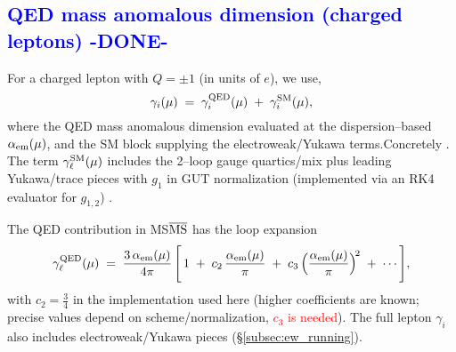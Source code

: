 \documentclass[%
 amsmath,amssymb,
 aps,
prb,
floatfix, showkeys
]{revtex4-2}
\newcommand{\need}[1]{\textcolor{red}{#1}}
\newcommand{\modif}[1]{\textcolor{blue}{#1}}
\begin{document}
{\modif{
\subsection{QED mass anomalous dimension (charged leptons) -DONE-}   %
\label{subsec:qed_ad}
}}
For a charged lepton with $Q=\pm 1$ (in units of $e$), we use, 
\begin{equation}
  \gamma_i(\mu)\;=\;\gamma^{\rm QED}_i(\mu)\;+\;\gamma^{\rm SM}_i(\mu),
\end{equation}
where the QED mass anomalous dimension evaluated at the dispersion--based $\alpha_{\rm em}(\mu)$,
and the SM block supplying the electroweak/Yukawa terms.\;Concretely \cite{Tarrach1981}.
The term $\gamma^{\rm SM}_\ell(\mu)$ includes the 2--loop gauge quartics/mix plus leading
Yukawa/trace pieces with $g_1$ in GUT normalization (implemented via an RK4 evaluator
for $g_{1,2}$) \cite{MachacekVaughn1983-85,Buttazzo2013}.
  
The QED contribution in MS$\overline{\rm MS}$ has the loop expansion
\begin{equation}
  \gamma_{\ell}^{\rm QED}(\mu) \;=\; \frac{3\,\alpha_{\rm em}(\mu)}{4\pi}\,\Bigg[\,1\;+\;
  c_2\,\frac{\alpha_{\rm em}(\mu)}{\pi}\;+\;c_3\,\Big(\frac{\alpha_{\rm em}(\mu)}{\pi}\Big)^{\!2}\;+\;\cdots\Bigg],
  \label{eq:qed_gamma_series}
\end{equation}
with $c_2=\tfrac{3}{4}$ in the implementation used here (higher coefficients are known;
precise values depend on scheme/normalization, {\need{ $c_3$ is needed}}).
The full lepton $\gamma_i$ also
includes electroweak/Yukawa pieces (\S\ref{subsec:ew_running}).
\end{document}
